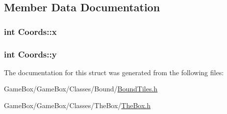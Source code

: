 \subsection{\-Member \-Data \-Documentation}
\hypertarget{struct_coords_a59992d986e76375f31828d32c05cd15d}{
\subsubsection[{x}]{\setlength{\rightskip}{0pt plus 5cm}int {\bf \-Coords\-::x}}}\label{struct_coords_a59992d986e76375f31828d32c05cd15d}
\hypertarget{struct_coords_a7ed64d02fb7550f1506a93fcfab7f16f}{
\subsubsection[{y}]{\setlength{\rightskip}{0pt plus 5cm}int {\bf \-Coords\-::y}}}\label{struct_coords_a7ed64d02fb7550f1506a93fcfab7f16f}


\-The documentation for this struct was generated from the following files\-:\begin{DoxyCompactItemize}
\item 
\-Game\-Box/\-Game\-Box/\-Classes/\-Bound/\hyperlink{_bound_tiles_8h}{\-Bound\-Tiles.\-h}\item 
\-Game\-Box/\-Game\-Box/\-Classes/\-The\-Box/\hyperlink{_the_box_8h}{\-The\-Box.\-h}\end{DoxyCompactItemize}
